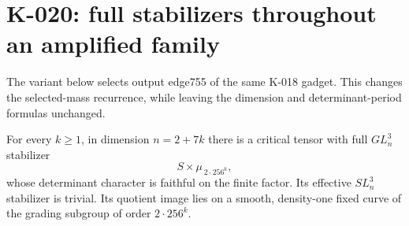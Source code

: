 \section{K-020: full stabilizers throughout an amplified family}

The variant below selects output edge755 of the same K-018
gadget.  This changes the selected-mass recurrence, while leaving
the dimension and determinant-period formulas unchanged.

\begin{theorem}[K-020]
For every $k\ge1$, in dimension $n=2+7k$ there is a critical
tensor with full $GL_n^3$ stabilizer
\[
                  S\times\mu_{\,2\cdot256^k},
\]
whose determinant character is faithful on the finite factor.
Its effective $SL_n^3$ stabilizer is trivial.  Its quotient image
lies on a smooth, density-one fixed curve of the grading subgroup
of order $2\cdot256^k$.
\end{theorem}

